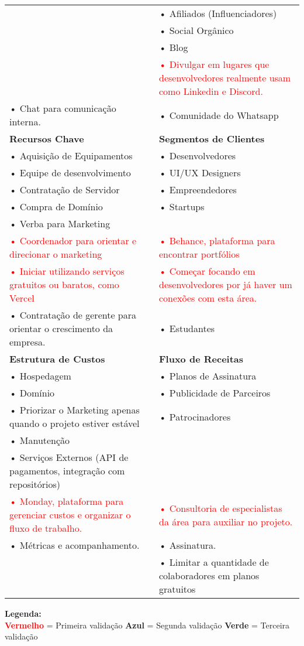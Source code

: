 \documentclass{article}
\begin{document}
\begin{table}[H]
\begin{tabular}{|p{6cm}|p{6cm}|p{6cm}|}
& & • Afiliados (Influenciadores) \\
& & • Social Orgânico \\
& & • Blog \\
& & \textcolor{red}{• Divulgar em lugares que desenvolvedores realmente usam como Linkedin e Discord.} \\
\textcolor{blueval}{• Chat para comunicação interna.} &
& 
\textcolor{blueval}{• Comunidade do Whatsapp} \\
\hline
\rowcolor{lightgray}
\textbf{Recursos Chave} & & \textbf{Segmentos de Clientes} \\
\cline{1-1}\cline{2-2}\cline{3-3}
• Aquisição de Equipamentos & & • Desenvolvedores \\
• Equipe de desenvolvimento & & • UI/UX Designers \\
• Contratação de Servidor & & • Empreendedores \\
• Compra de Domínio & & • Startups \\
• Verba para Marketing & & \\
\textcolor{red}{• Coordenador para orientar e direcionar o marketing} &
& 
\textcolor{red}{• Behance, plataforma para encontrar portfólios} \\
\textcolor{red}{• Iniciar utilizando serviços gratuitos ou baratos, como Vercel} & & 
\textcolor{red}{• Começar focando em desenvolvedores por já haver um conexões com esta área.} \\
\textcolor{blueval}{• Contratação de gerente para orientar o crescimento da empresa.} &
& 
\textcolor{blueval}{• Estudantes} \\
\hline
\rowcolor{lightgray}
\textbf{Estrutura de Custos} & & \textbf{Fluxo de Receitas} \\
\hline
• Hospedagem & & • Planos de Assinatura \\
• Domínio & & • Publicidade de Parceiros \\
• \textcolor{blueval}{Priorizar o} Marketing \textcolor{blueval}{apenas quando o projeto estiver estável} & & • Patrocinadores \\
• Manutenção & & \\
• Serviços Externos (API de pagamentos, integração com repositórios) & & \\
\textcolor{red}{• Monday, plataforma para gerenciar custos e organizar o fluxo de trabalho.} &
&
\textcolor{red}{• Consultoria de especialistas da área para auxiliar no projeto.} \\
\textcolor{blueval}{• Métricas e acompanhamento.} &
&
\textcolor{blueval}{• Assinatura.} \\
& & \textcolor{blueval}{• Limitar a quantidade de colaboradores em planos gratuitos}  \\
\hline
\end{tabular}

\begin{center}
\textbf{Legenda:} \\
\textcolor{red}{\textbf{Vermelho}} = Primeira validação \quad
\textcolor{blueval}{\textbf{Azul}} = Segunda validação \quad
\textcolor{greenval}{\textbf{Verde}} = Terceira validação
\end{center}

\end{table}
\end{document}
